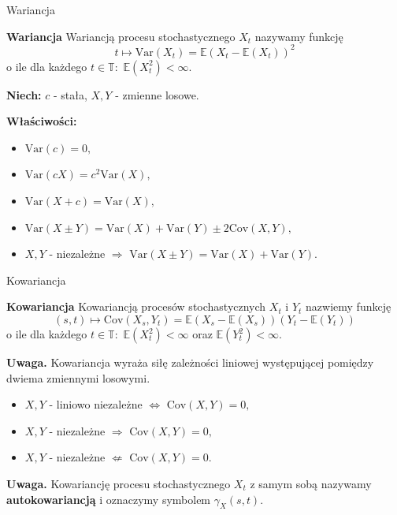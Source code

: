 \documentclass[a4paper, 11pt]{beamer}
\begin{document}
	\begin{frame}{Wariancja}
		\begin{block}{\textbf{Wariancja}}
			Wariancją procesu stochastycznego $X_t$ nazywamy funkcję \[
				t \mapsto \mbox{Var}\left(X_t\right)
					= \mathbb{E}\left(X_t - \mathbb{E}\left(X_t\right)\right)^2
			\]
			o ile dla każdego $t\in\mathbb{T}:$ $\mathbb{E}\left(X_t^2\right) < \infty.$
		\end{block}
		
		\textbf{Niech:} $c$ - stała, $X,Y$ - zmienne losowe.
		
		\textbf{Właściwości:}
		\begin{itemize}
			\item $\mbox{Var}\left(c\right) = 0,$
			\item $\mbox{Var}\left(cX\right) = c^2 \mbox{Var}\left(X\right),$
			\item $\mbox{Var}\left(X + c\right) = \mbox{Var}\left(X\right),$
			\item $\mbox{Var}\left(X \pm Y\right) = \mbox{Var}\left(X\right) + \mbox{Var}\left(Y\right) \pm 2 \mbox{Cov}\left(X,Y\right),$
			\item $X,Y$ - niezależne $\Rightarrow$ $\mbox{Var}\left(X \pm Y\right) = \mbox{Var}\left(X\right) + \mbox{Var}\left(Y\right).$
		\end{itemize}
	\end{frame}
	
	\begin{frame}{Kowariancja}
		\begin{block}{\textbf{Kowariancja}}
			Kowariancją procesów stochastycznych $X_t$ i $Y_t$ nazwiemy funkcję \[
				\left(s,t\right) \mapsto \mbox{Cov}\left(X_s, Y_t\right)
					= \mathbb{E}\left(X_s - \mathbb{E}\left(X_s\right)\right)\left(Y_t - \mathbb{E}\left(Y_t\right)\right)
			\]
			o ile dla każdego $t\in\mathbb{T}:$ $\mathbb{E}\left(X_t^2\right) < \infty$ oraz $\mathbb{E}\left(Y_t^2\right) < \infty.$
		\end{block}
		
		\begin{alert}{\textbf{Uwaga.}}
			Kowariancja wyraża siłę zależności liniowej występującej pomiędzy dwiema zmiennymi losowymi.
			\begin{itemize}
				\item $X, Y$ - liniowo niezależne $\Leftrightarrow$ $\mbox{Cov}\left(X, Y\right) = 0,$
				\item $X, Y$ - niezależne $\Rightarrow$ $\mbox{Cov}\left(X, Y\right) = 0,$
				\item $X, Y$ - niezależne $\not\Leftarrow$ $\mbox{Cov}\left(X, Y\right) = 0.$
			\end{itemize}
		\end{alert}
		
		\begin{alert}{\textbf{Uwaga.}}
			Kowariancję procesu stochastycznego $X_t$ z samym sobą nazywamy \textbf{autokowariancją} i
			oznaczymy symbolem $\gamma_X\left(s,t\right).$
		\end{alert}
	\end{frame}
	
\end{document}
